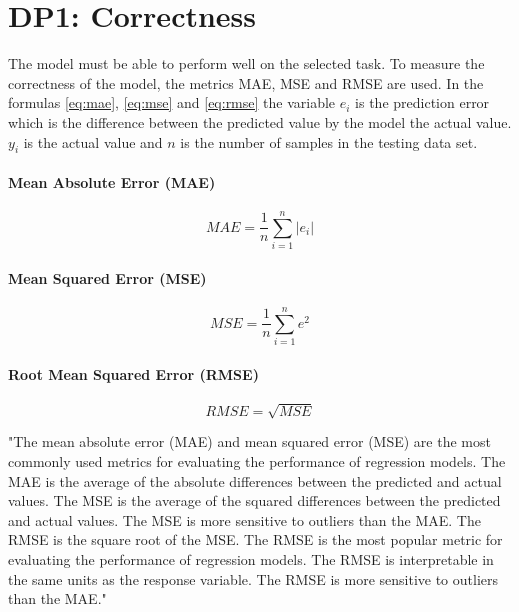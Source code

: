 \section{DP1: Correctness}
The model must be able to perform well on the selected task. 
To measure the correctness of the model, the metrics MAE, MSE and RMSE are used.
In the formulas \ref{eq:mae}, \ref{eq:mse} and \ref{eq:rmse} the variable $e_i$ is the prediction error which is the difference between the predicted value by the model the actual value. 
$y_i$ is the actual value and $n$ is the number of samples in the testing data set.

\paragraph*{Mean Absolute Error (MAE)}

\begin{equation}
    \label{eq:mae}
    MAE = \frac{1}{n} \sum_{i=1}^{n} |e_i|
\end{equation}

\paragraph*{Mean Squared Error (MSE)}

\begin{equation}
    \label{eq:mse}
    MSE = \frac{1}{n} \sum_{i=1}^{n} e^2
\end{equation}

\paragraph*{Root Mean Squared Error (RMSE)}

\begin{equation}
    \label{eq:rmse}
    RMSE = \sqrt{MSE}
\end{equation}

"The mean absolute error (MAE) and mean squared error (MSE) are the most commonly used metrics for
evaluating the performance of regression models. The MAE is the average of the absolute differences between
the predicted and actual values. The MSE is the average of the squared differences between the predicted and
actual values. The MSE is more sensitive to outliers than the MAE. The RMSE is the square root of the MSE.
The RMSE is the most popular metric for evaluating the performance of regression models. The RMSE is
interpretable in the same units as the response variable. The RMSE is more sensitive to outliers than the MAE." 


